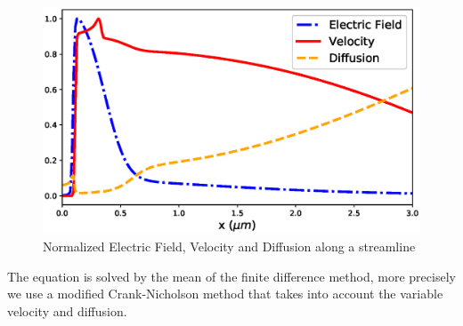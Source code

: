 \documentclass[10pt,a4paper,twocolumn]{article}
\begin{document}
\begin{figure}[hbtp]
\centering
\includegraphics[scale=0.5]{../pictures/NewDiffusionVeloField.eps}
\caption{Normalized Electric Field, Velocity and Diffusion along a streamline}
\label{fig:VelocityDiffusion}
\end{figure}
The equation is solved by the mean of the finite difference method, more precisely we use a modified Crank-Nicholson method that takes into account the variable velocity and diffusion.


\end{document}

